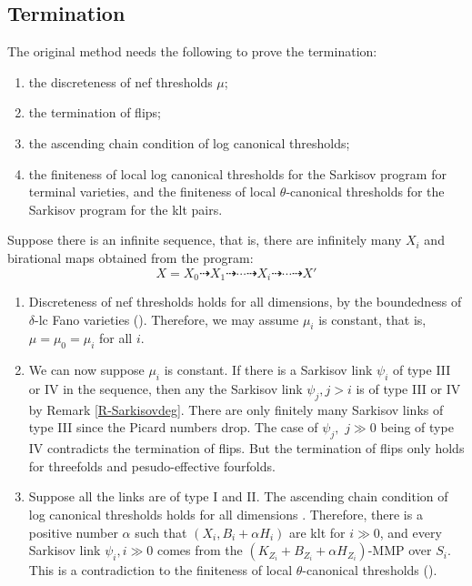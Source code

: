 \subsection{Termination}\label{termination1}
The original method  needs the following to prove the termination:
\begin{enumerate}
  \item the discreteness of nef thresholds $\mu$;
  \item the termination of flips;
  \item the ascending chain condition of log canonical thresholds;
  \item the finiteness of local log canonical thresholds for the Sarkisov program for terminal varieties, and the finiteness of local $\theta$-canonical thresholds for the Sarkisov program for the klt pairs.
\end{enumerate}
Suppose there is an infinite sequence, that is,  there are infinitely many $ X_i $ and birational maps obtained from the program:
\[ X=X_0\dashrightarrow X_1\dashrightarrow \cdots\dashrightarrow X_i \dashrightarrow\cdots\dashrightarrow X'\]
\begin{enumerate}
  \item Discreteness of nef thresholds holds for all dimensions, by the boundedness of $\delta$-lc Fano varieties (\cite[Theorem 1.1]{birkarSingularitiesLinearSystems2020}). Therefore, we may assume $\mu_{i}$ is constant, that is, $\mu=\mu_{0}=\mu_{i}$ for all $i$.
  \item We can now suppose $\mu_i$ is constant. If there is a Sarkisov link $\psi_i$ of type III or IV in the sequence, then any the Sarkisov link $\psi_j, j>i$ is of type III or IV by Remark \ref{R-Sarkisovdeg}. There are only finitely many Sarkisov links of type III since the Picard numbers drop. The case of $\psi_j,$ $j\gg 0$ being of type IV contradicts the termination of flips. But the termination of flips only holds for threefolds and pesudo-effective fourfolds.
  \item Suppose all the links are of type I and II. The ascending chain condition of log canonical thresholds holds for all dimensions \cite{HMX14}. Therefore, there is a positive number $\alpha$ such that $(X_i,B_i+\alpha H_i)$ are klt for $i\gg 0$, and every Sarkisov link $\psi_i,i\gg 0$ comes from the $(K_{Z_i}+B_{Z_i}+\alpha H_{Z_i})$-MMP over $S_i$. This is a contradiction to  the finiteness of local $\theta$-canonical thresholds (\cite[Claim 2.2]{brunoLogSarkisovProgram1995}).
\end{enumerate}

